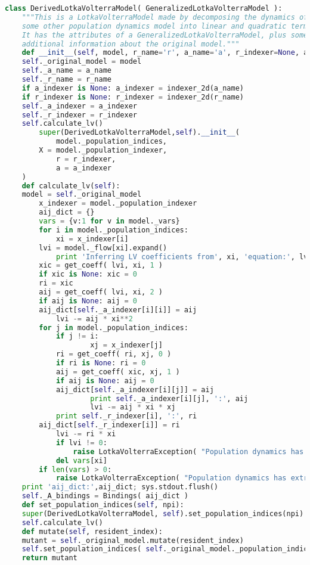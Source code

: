 \begin{lstlisting}[language=Python]
class DerivedLotkaVolterraModel( GeneralizedLotkaVolterraModel ):
    """This is a LotkaVolterraModel made by decomposing the dynamics of
    some other population dynamics model into linear and quadratic terms.
    It has the attributes of a GeneralizedLotkaVolterraModel, plus some
    additional information about the original model."""
    def __init__(self, model, r_name='r', a_name='a', r_indexer=None, a_indexer=None ):
	self._original_model = model
	self._a_name = a_name
	self._r_name = r_name
	if a_indexer is None: a_indexer = indexer_2d(a_name)
	if r_indexer is None: r_indexer = indexer_2d(r_name)
	self._a_indexer = a_indexer
	self._r_indexer = r_indexer
	self.calculate_lv()
        super(DerivedLotkaVolterraModel,self).__init__(
            model._population_indices,
	    X = model._population_indexer,
            r = r_indexer,
            a = a_indexer
	)
    def calculate_lv(self):
	model = self._original_model
        x_indexer = model._population_indexer
        aij_dict = {}
        vars = {v:1 for v in model._vars}
        for i in model._population_indices:
            xi = x_indexer[i]
	    lvi = model._flow[xi].expand()
            print 'Inferring LV coefficients from', xi, 'equation:', lvi
	    xic = get_coeff( lvi, xi, 1 )
	    if xic is None: xic = 0
	    ri = xic
	    aij = get_coeff( lvi, xi, 2 )
	    if aij is None: aij = 0
	    aij_dict[self._a_indexer[i][i]] = aij
            lvi -= aij * xi**2
	    for j in model._population_indices:
	        if j != i:
                    xj = x_indexer[j]
		    ri = get_coeff( ri, xj, 0 )
		    if ri is None: ri = 0
		    aij = get_coeff( xic, xj, 1 )
		    if aij is None: aij = 0
		    aij_dict[self._a_indexer[i][j]] = aij
                    print self._a_indexer[i][j], ':', aij
                    lvi -= aij * xi * xj
            print self._r_indexer[i], ':', ri
	    aij_dict[self._r_indexer[i]] = ri
            lvi -= ri * xi
            if lvi != 0:
                raise LotkaVolterraException( "Population dynamics has excess terms in " + str(i) + "'th component: " + str(lvi) )
            del vars[xi]
        if len(vars) > 0:
            raise LotkaVolterraException( "Population dynamics has extra variables: " + ', '.join(vars.keys()) )
	print 'aij_dict:',aij_dict; sys.stdout.flush()
	self._A_bindings = Bindings( aij_dict ) 
    def set_population_indices(self, npi):
	super(DerivedLotkaVolterraModel, self).set_population_indices(npi)
	self.calculate_lv()
    def mutate(self, resident_index):
	mutant = self._original_model.mutate(resident_index)
	self.set_population_indices( self._original_model._population_indices )
	return mutant


\end{lstlisting}
